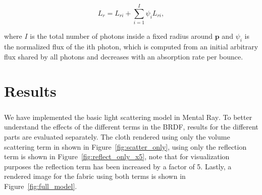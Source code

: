 \documentclass[12pt]{article}
\begin{document}
\begin{equation}
L_r = L_{ri} + \sum_{i = 1}^{I} \psi_i L_{ri},
\end{equation}

where $I$ is the total number of photons inside a fixed radius around $\mathbf{p}$ and $\psi_i$ is the normalized flux of the ith photon, which is computed from an initial arbitrary flux shared by all photons and decreases with an absorption rate per bounce.

\section{Results}

We have implemented the basic light scattering model in Mental Ray\textsuperscript\textregistered.
To better understand the effects of the different terms in the BRDF, results for the different parts are evaluated separately.
The cloth rendered using only the volume scattering term in shown in Figure~\ref{fig:scatter_only}, using only the reflection term is shown in Figure~\ref{fig:reflect_only_x5}, note that for visualization purposes the reflection term has been increased by a factor of 5.
Lastly, a rendered image for the fabric using both terms is shown in Figure~\ref{fig:full_model}.
\end{document}
